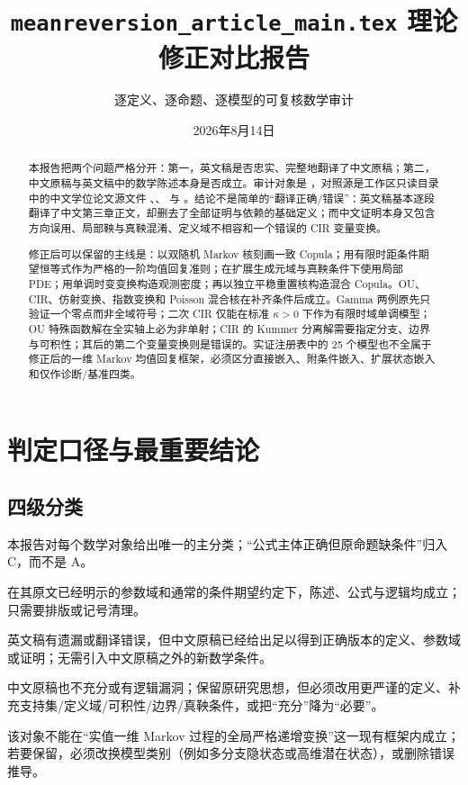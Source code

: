 \documentclass[UTF8,11pt]{ctexart}
\title{\texttt{meanreversion\_article\_main.tex} 理论修正对比报告}
\author{逐定义、逐命题、逐模型的可复核数学审计}
\date{2026年8月14日}
\newcommand{\Acat}{\textcolor{green!45!black}{\textbf{A：正确}}}
\newcommand{\Bcat}{\textcolor{blue!65!black}{\textbf{B：可由中文原稿完整修正}}}
\newcommand{\Ccat}{\textcolor{orange!80!black}{\textbf{C：须补充定义或条件修正}}}
\newcommand{\Dcat}{\textcolor{red!70!black}{\textbf{D：现有框架中难以修正}}}
\begin{document}
\maketitle

\begin{abstract}
本报告把两个问题严格分开：第一，英文稿是否忠实、完整地翻译了中文原稿；第二，中文原稿与英文稿中的数学陈述本身是否成立。审计对象是
，对照源是工作区只读目录中的中文学位论文源文件
、、 与
。结论不是简单的“翻译正确/错误”：英文稿基本逐段翻译了中文第三章正文，却删去了全部证明与依赖的基础定义；而中文证明本身又包含方向误用、局部鞅与真鞅混淆、定义域不相容和一个错误的 CIR 变量变换。

修正后可以保留的主线是：以双随机 Markov 核刻画一致 Copula；用有限时距条件期望恒等式作为严格的一阶均值回复准则；在扩展生成元域与真鞅条件下使用局部 PDE；用单调时变变换构造观测密度；再以独立平稳重置核构造混合 Copula。OU、CIR、仿射变换、指数变换和 Poisson 混合核在补齐条件后成立。Gamma 两例原先只验证一个零点而非全域符号；二次 CIR 仅能在标准 $\kappa>0$ 下作为有限时域单调模型；OU 特殊函数解在全实轴上必为非单射；CIR 的 Kummer 分离解需要指定分支、边界与可积性；其后的第二个变量变换则是错误的。实证注册表中的 25 个模型也不全属于修正后的一维 Markov 均值回复框架，必须区分直接嵌入、附条件嵌入、扩展状态嵌入和仅作诊断/基准四类。
\end{abstract}

\section{判定口径与最重要结论}

\subsection{四级分类}

本报告对每个数学对象给出唯一的主分类；“公式主体正确但原命题缺条件”归入 C，而不是 A。
\begin{description}[style=nextline]
  \item[\Acat] 在其原文已经明示的参数域和通常的条件期望约定下，陈述、公式与逻辑均成立；只需要排版或记号清理。
  \item[\Bcat] 英文稿有遗漏或翻译错误，但中文原稿已经给出足以得到正确版本的定义、参数域或证明；无需引入中文原稿之外的新数学条件。
  \item[\Ccat] 中文原稿也不充分或有逻辑漏洞；保留原研究思想，但必须改用更严谨的定义、补充支持集/定义域/可积性/边界/真鞅条件，或把“充分”降为“必要”。
  \item[\Dcat] 该对象不能在“实值一维 Markov 过程的全局严格递增变换”这一现有框架内成立；若要保留，必须改换模型类别（例如多分支隐状态或高维潜在状态），或删除错误推导。
\end{description}
\end{document}
